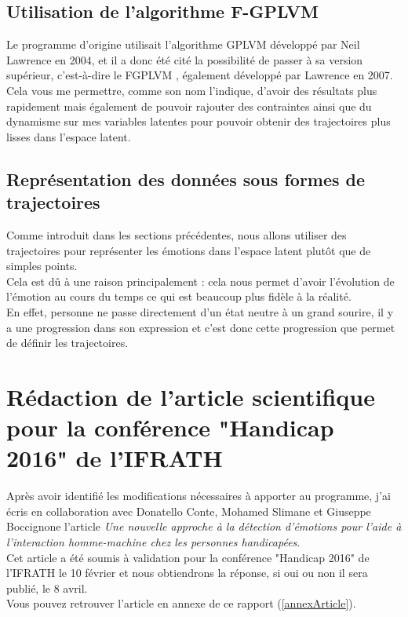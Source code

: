 \documentclass[poster]{polytech/polytech}
\begin{document}
\section{Utilisation de l'algorithme F-GPLVM}
Le programme d'origine utilisait l'algorithme GPLVM développé par Neil Lawrence \cite{lawrence2004} \cite{gplvm_github} en 2004, et il a donc été cité la possibilité de passer à sa version supérieur, c'est-à-dire le FGPLVM \cite{fgplvm_github}, également développé par Lawrence en 2007.\\
Cela vous me permettre, comme son nom l'indique, d'avoir des résultats plus rapidement mais également de pouvoir rajouter des contraintes ainsi que du dynamisme sur mes variables latentes pour pouvoir obtenir des trajectoires plus lisses dans l'espace latent.

\section{Représentation des données sous formes de trajectoires}
Comme introduit dans les sections précédentes, nous allons utiliser des trajectoires pour représenter les émotions dans l'espace latent plutôt que de simples points.\\
Cela est dû à une raison principalement : cela nous permet d'avoir l'évolution de l'émotion au cours du temps ce qui est beaucoup plus fidèle à la réalité.\\
En effet, personne ne passe directement d'un état neutre à un grand sourire, il y a	 une progression dans son expression et c'est donc cette progression que permet de définir les trajectoires.


\chapter{Rédaction de l'article scientifique pour la conférence "Handicap 2016" de l'IFRATH}
Après avoir identifié les modifications nécessaires à apporter au programme, j'ai écris en collaboration avec Donatello Conte, Mohamed Slimane et Giuseppe Boccignone l'article \textit{Une nouvelle approche à la détection d'émotions pour l'aide à l'interaction homme-machine chez les personnes handicapées}.\\
Cet article a été soumis à validation pour la conférence "Handicap 2016" de l'IFRATH le 10 février et nous obtiendrons la réponse, si oui ou non il sera publié, le 8 avril.\\
Vous pouvez retrouver l'article en annexe de ce rapport (\autoref{annexArticle}).
\end{document}

